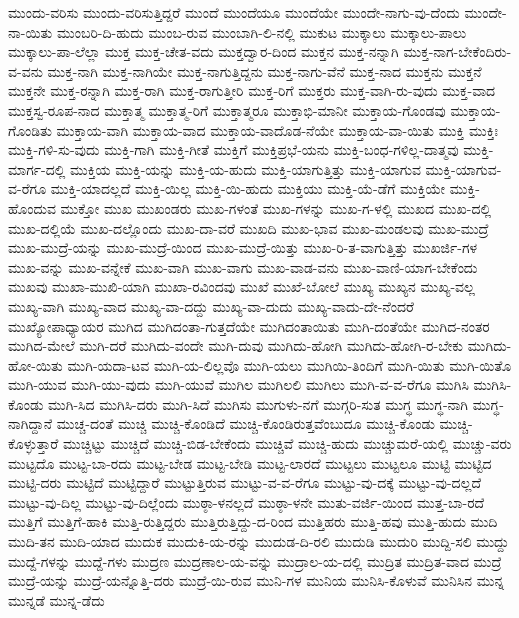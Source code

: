 ಮುಂದು-ವರಿಸು
ಮುಂದು-ವರಿಸುತ್ತಿದ್ದರೆ
ಮುಂದೆ
ಮುಂದೆಯೂ
ಮುಂದೆಯೇ
ಮುಂದೇ-ನಾಗು-ವು-ದೆಂದು
ಮುಂದೇ-ನಾ-ಯಿತು
ಮುಂಬರಿ-ದಿ-ಹುದು
ಮುಂಬ-ರುವ
ಮುಂಬಾಗಿ-ಲಿ-ನಲ್ಲಿ
ಮುಕುಟ
ಮುಕ್ಕಾಲು
ಮುಕ್ಕಾಲು-ಪಾಲು
ಮುಕ್ಕಾಲು-ಪಾ-ಲೆಲ್ಲಾ
ಮುಕ್ತ
ಮುಕ್ತ-ಚೇತ-ವದು
ಮುಕ್ತದ್ವಾರ-ದಿಂದ
ಮುಕ್ತನ
ಮುಕ್ತ-ನನ್ನಾಗಿ
ಮುಕ್ತ-ನಾಗ-ಬೇಕೆಂದಿರು-ವ-ವನು
ಮುಕ್ತ-ನಾಗಿ
ಮುಕ್ತ-ನಾಗಿಯೇ
ಮುಕ್ತ-ನಾಗುತ್ತಿದ್ದನು
ಮುಕ್ತ-ನಾಗು-ವೆನೆ
ಮುಕ್ತ-ನಾದ
ಮುಕ್ತನು
ಮುಕ್ತನೆ
ಮುಕ್ತನೇ
ಮುಕ್ತ-ರನ್ನಾಗಿ
ಮುಕ್ತ-ರಾಗಿ
ಮುಕ್ತ-ರಾಗುತ್ತೀರಿ
ಮುಕ್ತ-ರಿಗೆ
ಮುಕ್ತರು
ಮುಕ್ತ-ವಾಗಿ-ರು-ವುದು
ಮುಕ್ತ-ವಾದ
ಮುಕ್ತಸ್ವ-ರೂಪ-ನಾದ
ಮುಕ್ತಾತ್ಮ
ಮುಕ್ತಾತ್ಮ-ರಿಗೆ
ಮುಕ್ತಾತ್ಮರೂ
ಮುಕ್ತಾಭಿ-ಮಾನೀ
ಮುಕ್ತಾಯ-ಗೊಂಡವು
ಮುಕ್ತಾಯ-ಗೊಂಡಿತು
ಮುಕ್ತಾಯ-ವಾಗಿ
ಮುಕ್ತಾಯ-ವಾದ
ಮುಕ್ತಾಯ-ವಾದೊಡ-ನೆಯೇ
ಮುಕ್ತಾಯ-ವಾ-ಯಿತು
ಮುಕ್ತಿ
ಮುಕ್ತಿಃ
ಮುಕ್ತಿ-ಗಳಿ-ಸು-ವುದು
ಮುಕ್ತಿ-ಗಾಗಿ
ಮುಕ್ತಿ-ಗೀತೆ
ಮುಕ್ತಿಗೆ
ಮುಕ್ತಿಪ್ರಭೆ-ಯನು
ಮುಕ್ತಿ-ಬಂಧ-ಗಳಿಲ್ಲ-ದಾತ್ಮವು
ಮುಕ್ತಿ-ಮಾರ್ಗ-ದಲ್ಲಿ
ಮುಕ್ತಿಯ
ಮುಕ್ತಿ-ಯನ್ನು
ಮುಕ್ತಿ-ಯ-ಹುದು
ಮುಕ್ತಿ-ಯಾಗುತ್ತಿತ್ತು
ಮುಕ್ತಿ-ಯಾಗುವ
ಮುಕ್ತಿ-ಯಾಗುವ-ವ-ರೆಗೂ
ಮುಕ್ತಿ-ಯಾದಲ್ಲದೆ
ಮುಕ್ತಿ-ಯಿಲ್ಲ
ಮುಕ್ತಿ-ಯಿ-ಹುದು
ಮುಕ್ತಿಯು
ಮುಕ್ತಿ-ಯೆ-ಡೆಗೆ
ಮುಕ್ತಿಯೇ
ಮುಕ್ತಿ-ಹೊಂದುವ
ಮುಕ್ತೋ
ಮುಖ
ಮುಖಂಡರು
ಮುಖ-ಗಳಂತೆ
ಮುಖ-ಗಳನ್ನು
ಮುಖ-ಗ-ಳಲ್ಲಿ
ಮುಖದ
ಮುಖ-ದಲ್ಲಿ
ಮುಖ-ದಲ್ಲಿಯೆ
ಮುಖ-ದಲ್ಲೊಂದು
ಮುಖ-ದಾ-ವರೆ
ಮುಖದಿ
ಮುಖ-ಭಾವ
ಮುಖ-ಮಂಡಲವು
ಮುಖ-ಮುದ್ರೆ
ಮುಖ-ಮುದ್ರೆ-ಯನ್ನು
ಮುಖ-ಮುದ್ರೆ-ಯಿಂದ
ಮುಖ-ಮುದ್ರೆ-ಯಿತ್ತು
ಮುಖ-ರಿ-ತ-ವಾಗುತ್ತಿತ್ತು
ಮುಖರ್ಜಿ-ಗಳ
ಮುಖ-ವನ್ನು
ಮುಖ-ವನ್ನೇಕೆ
ಮುಖ-ವಾಗಿ
ಮುಖ-ವಾಗು
ಮುಖ-ವಾಡ-ವನು
ಮುಖ-ವಾಣಿ-ಯಾಗ-ಬೇಕೆಂದು
ಮುಖವು
ಮುಖಾ-ಮುಖಿ-ಯಾಗಿ
ಮುಖಾ-ರವಿಂದವು
ಮುಖೆ
ಮುಖೆ-ಬೋಲೆ
ಮುಖ್ಯ
ಮುಖ್ಯನ
ಮುಖ್ಯ-ವಲ್ಲ
ಮುಖ್ಯ-ವಾಗಿ
ಮುಖ್ಯ-ವಾದ
ಮುಖ್ಯ-ವಾ-ದದ್ದು
ಮುಖ್ಯ-ವಾ-ದುದು
ಮುಖ್ಯ-ವಾದು-ದೇ-ನೆಂದರೆ
ಮುಖ್ಯೋಪಾಧ್ಯಾಯರ
ಮುಗಿದ
ಮುಗಿದಂತಾ-ಗುತ್ತದೆಯೇ
ಮುಗಿದಂತಾಯಿತು
ಮುಗಿ-ದಂತೆಯೇ
ಮುಗಿದ-ನಂತರ
ಮುಗಿದ-ಮೇಲೆ
ಮುಗಿ-ದರೆ
ಮುಗಿದು-ವಂದೇ
ಮುಗಿ-ದುವು
ಮುಗಿದು-ಹೋಗಿ
ಮುಗಿದು-ಹೋಗಿ-ರ-ಬೇಕು
ಮುಗಿದು-ಹೋ-ಯಿತು
ಮುಗಿ-ಯದಾ-ಟವ
ಮುಗಿ-ಯ-ಲಿಲ್ಲವೊ
ಮುಗಿ-ಯಲು
ಮುಗಿಯಿ-ತಿಂದಿಗೆ
ಮುಗಿ-ಯಿತು
ಮುಗಿ-ಯಿತೊ
ಮುಗಿ-ಯುವ
ಮುಗಿ-ಯು-ವುದು
ಮುಗಿ-ಯುವೆ
ಮುಗಿಲ
ಮುಗಿಲಲಿ
ಮುಗಿಲು
ಮುಗಿ-ವ-ವ-ರೆಗೂ
ಮುಗಿಸಿ
ಮುಗಿಸಿ-ಕೊಂಡು
ಮುಗಿ-ಸಿದ
ಮುಗಿಸಿ-ದರು
ಮುಗಿ-ಸಿದೆ
ಮುಗಿಸು
ಮುಗುಳು-ನಗೆ
ಮುಗ್ಗರಿ-ಸುತ
ಮುಗ್ಧ
ಮುಗ್ಧ-ನಾಗಿ
ಮುಗ್ಧ-ನಾಗಿದ್ದಾನೆ
ಮುಚ್ಚ-ದಂತೆ
ಮುಚ್ಚಿ
ಮುಚ್ಚಿ-ಕೊಂಡಿದೆ
ಮುಚ್ಚಿ-ಕೊಂಡಿರುತ್ತವೆಂಬುದೂ
ಮುಚ್ಚಿ-ಕೊಂಡು
ಮುಚ್ಚಿ-ಕೊಳ್ಳುತ್ತಾರೆ
ಮುಚ್ಚಿಟ್ಟು
ಮುಚ್ಚಿದೆ
ಮುಚ್ಚಿ-ಬಿಡ-ಬೇಕೆಂದು
ಮುಚ್ಚಿವೆ
ಮುಚ್ಚಿ-ಹುದು
ಮುಚ್ಚುಮರೆ-ಯಲ್ಲಿ
ಮುಚ್ಚು-ವರು
ಮುಟ್ಟದೊ
ಮುಟ್ಟ-ಬಾ-ರದು
ಮುಟ್ಟ-ಬೇಡ
ಮುಟ್ಟ-ಬೇಡಿ
ಮುಟ್ಟ-ಲಾರದೆ
ಮುಟ್ಟಲು
ಮುಟ್ಟಲೂ
ಮುಟ್ಟಿ
ಮುಟ್ಟಿದ
ಮುಟ್ಟಿ-ದರು
ಮುಟ್ಟಿದೆ
ಮುಟ್ಟಿದ್ದಾರೆ
ಮುಟ್ಟುತ್ತಿರುವ
ಮುಟ್ಟು-ವ-ವ-ರೆಗೂ
ಮುಟ್ಟು-ವು-ದಕ್ಕೆ
ಮುಟ್ಟು-ವು-ದಲ್ಲದೆ
ಮುಟ್ಟು-ವು-ದಿಲ್ಲ
ಮುಟ್ಟು-ವು-ದಿಲ್ಲೆಂದು
ಮುಠ್ಠಾ-ಳನಲ್ಲದೆ
ಮುಠ್ಠಾ-ಳನೇ
ಮುತು-ವರ್ಜಿ-ಯಿಂದ
ಮುತ್ತ-ಬಾ-ರದೆ
ಮುತ್ತಿಗೆ
ಮುತ್ತಿಗೆ-ಹಾಕಿ
ಮುತ್ತಿ-ರುತ್ತಿದ್ದರು
ಮುತ್ತಿರುತ್ತಿದ್ದು-ದ-ರಿಂದ
ಮುತ್ತಿಹರು
ಮುತ್ತಿ-ಹವು
ಮುತ್ತಿ-ಹುದು
ಮುದಿ
ಮುದಿ-ತನ
ಮುದಿ-ಯಾದ
ಮುದುಕ
ಮುದುಕಿ-ಯ-ರನ್ನು
ಮುದುಡ-ದಿ-ರಲಿ
ಮುದುಡಿ
ಮುದುರಿ
ಮುದ್ದಿ-ಸಲಿ
ಮುದ್ದು
ಮುದ್ದೆ-ಗಳನ್ನು
ಮುದ್ದೆ-ಗಳು
ಮುದ್ರಣ
ಮುದ್ರಣಾಲ-ಯ-ವನ್ನು
ಮುದ್ರಾಲ-ಯ-ದಲ್ಲಿ
ಮುದ್ರಿತ
ಮುದ್ರಿತ-ವಾದ
ಮುದ್ರೆ
ಮುದ್ರೆ-ಯನ್ನು
ಮುದ್ರೆ-ಯನ್ನೊತ್ತಿ-ದರು
ಮುದ್ರೆ-ಯಿ-ರುವ
ಮುನಿ-ಗಳ
ಮುನಿಯ
ಮುನಿಸಿ-ಕೊಳುವೆ
ಮುನಿಸಿನ
ಮುನ್ನ
ಮುನ್ನಡೆ
ಮುನ್ನ-ಡೆದು
